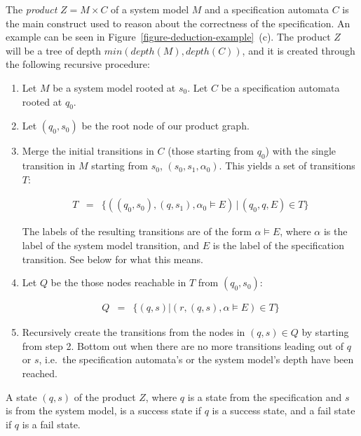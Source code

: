 \begin{mydef}\label{def-system-model-specification-product}
The \textit{product} $Z = M \times C$ of a system model $M$ and a specification
automata $C$ is the main construct used to reason about the correctness of the
specification. An example can be seen in
Figure~\ref{figure-deduction-example}~(c). The product $Z$ will be a tree of
depth $min(depth(M), depth(C))$, and it is created through the following
recursive procedure:

\begin{enumerate}
  \item Let $M$ be a system model rooted at $s_0$. Let $C$ be a specification
    automata rooted at $q_0$.

  \item Let $(q_0,s_0)$ be the root node of our product graph.

  \item Merge the initial transitions in $C$ (those starting from $q_0$) with
    the single transition in $M$ starting from $s_0$, $(s_0, s_1, \alpha_0)$.
    This yields a set of transitions $T$:

    \medskip
    \[
      \begin{array}{rcl}
        T & = & \{((q_0,s_0), (q,s_1), \alpha_0 \models E) \, | \, (q_0, q, E) \in T \}
      \end{array}
    \]
    \medskip

    The labels of the resulting transitions are of the form $\alpha \models E$,
    where $\alpha$ is the label of the system model transition, and $E$ is the
    label of the specification transition. See below for what this means.

  \item Let $Q$ be the those nodes reachable in $T$ from $(q_0,s_0)$:

    \medskip
    \[
      \begin{array}{rcl}
        Q & = & \{(q,s) | (r, (q,s), \alpha \models E) \in T\}
      \end{array}
    \]
    \medskip

  \item Recursively create the transitions from the nodes in $(q,s) \in Q$ by
    starting from step 2. Bottom out when there are no more transitions leading
    out of $q$ or $s$, i.e.\ the specification automata's or the system model's
    depth have been reached.

\end{enumerate}

A state $(q, s)$ of the product $Z$, where $q$ is a state from the
specification and $s$ is from the system model, is a success state if $q$ is a
success state, and a fail state if $q$ is a fail state.

\end{mydef}

